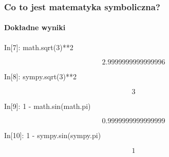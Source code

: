 \documentclass[10pt]{beamer}
\begin{document}
\begin{frame}[fragile]
  \frametitle{Co to jest matematyka symboliczna?}
  \framesubtitle{Dokładne wyniki}

  \begin{python}
    In[7]: math.sqrt(3)**2
  \end{python}
  \begin{equation*}
    2.9999999999999996
  \end{equation*}

  \begin{python}
    In[8]: sympy.sqrt(3)**2
  \end{python}
  \begin{equation*}
    3
  \end{equation*}

  \begin{python}
    In[9]: 1 - math.sin(math.pi)
  \end{python}
  \begin{equation*}
    0.9999999999999999
  \end{equation*}

  \begin{python}
    In[10]: 1 - sympy.sin(sympy.pi)
  \end{python}
  \begin{equation*}
    1
  \end{equation*}
\end{frame}
\end{document}
